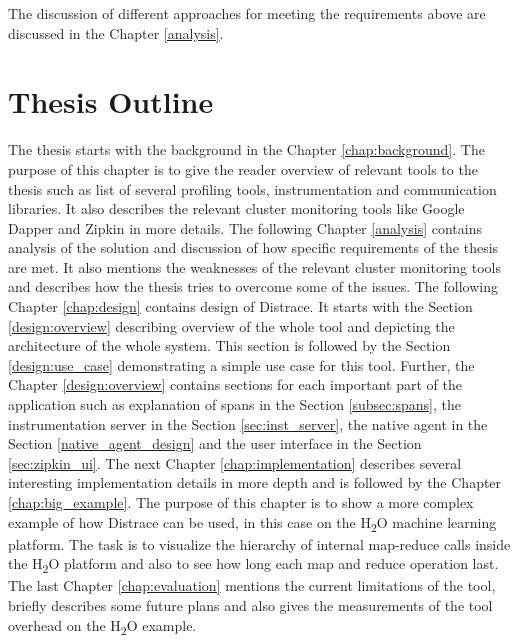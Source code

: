 The discussion of different approaches for meeting the requirements above are discussed in the Chapter \ref{analysis}.

\section{Thesis Outline}
The thesis starts with the background in the Chapter \ref{chap:background}. The purpose of this chapter is to give the reader overview of relevant tools to the thesis such as list of several profiling tools, instrumentation and communication libraries. It also describes the relevant cluster monitoring tools like Google Dapper and Zipkin in more details. The following Chapter \ref{analysis} contains analysis of the solution and discussion of how specific requirements of the thesis are met. It also mentions the weaknesses of the relevant cluster monitoring tools and describes how the thesis tries to overcome some of the issues. The following Chapter \ref{chap:design} contains design of Distrace. It starts with the Section \ref{design:overview} describing overview of the whole tool and depicting the architecture of the whole system. This section is followed by the Section \ref{design:use_case} demonstrating a simple use case for this tool. Further, the Chapter \ref{design:overview} contains sections for each important part of the application such as explanation of spans in the Section \ref{subsec:spans}, the instrumentation server in the Section \ref{sec:inst_server}, the native agent in the Section \ref{native_agent_design} and the user interface in the Section \ref{sec:zipkin_ui}. The next Chapter \ref{chap:implementation} describes several interesting implementation details in more depth and is followed by the Chapter \ref{chap:big_example}. The purpose of this chapter is to show a more complex example of how Distrace can be used, in this case on the H\textsubscript{2}O machine learning platform. The task is to visualize the hierarchy of internal map-reduce calls inside the H\textsubscript{2}O platform and also to see how long each map and reduce operation last. The last Chapter \ref{chap:evaluation} mentions the current limitations of the tool, briefly describes some future plans and also gives the measurements of the tool overhead on the H\textsubscript{2}O example. 
